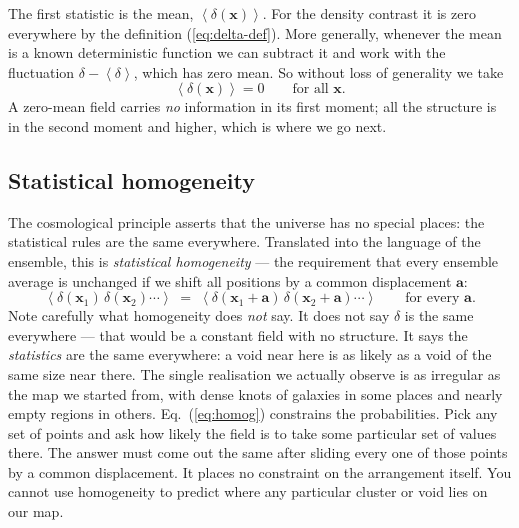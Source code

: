 \documentclass[12pt]{article}
\newcommand{\bx}{\mathbf{x}}
\newcommand{\ba}{\mathbf{a}}
\newcommand{\avg}[1]{\left\langle #1 \right\rangle}
\begin{document}
The first statistic is the mean, $\avg{\delta(\bx)}$.  For the density
contrast it is zero everywhere by the definition
(\ref{eq:delta-def}).  More generally, whenever the mean is a known
deterministic function we can subtract it and work with the
fluctuation $\delta - \avg{\delta}$, which has zero mean.  So without
loss of generality we take
\begin{equation}
  \avg{\delta(\bx)} = 0 \qquad \text{for all } \bx .
\end{equation}
A zero-mean field carries \emph{no} information in its first moment; all
the structure is in the second moment and higher, which is where we go
next.

\subsection{Statistical homogeneity}
\label{sec:homogeneity}

The cosmological principle asserts that the universe has no special
places: the statistical rules are the same everywhere.  Translated into
the language of the ensemble, this is \emph{statistical homogeneity} ---
the requirement that every ensemble average is unchanged if we shift all
positions by a common displacement $\ba$:
\begin{equation}
  \avg{\delta(\bx_1)\,\delta(\bx_2)\cdots}
  \;=\;
  \avg{\delta(\bx_1+\ba)\,\delta(\bx_2+\ba)\cdots}
  \qquad\text{for every }\ba .
  \label{eq:homog}
\end{equation}
Note carefully what homogeneity does \emph{not} say.  It does not say
$\delta$ is the same everywhere --- that would be a constant field with
no structure.  It says the \emph{statistics} are the same everywhere:
a void near here is as likely as a void of the same size near there.
The single realisation we actually observe is as irregular as the map we
started from, with dense knots of galaxies in some places and nearly
empty regions in others.  Eq.~(\ref{eq:homog}) constrains the probabilities.  Pick any set of
points and ask how likely the field is to take some particular set of
values there.  The answer must come out the same after sliding every one
of those points by a common displacement.  It places no constraint on the arrangement itself.  You
cannot use homogeneity to predict where any particular cluster or void
lies on our map.
\end{document}
